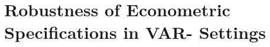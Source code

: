 \documentclass[a4paper,11pt,listof=nochaptergap,oneside,pointednumbers,bibtotoc,bigheadings,liststotoc,hidelinks]{scrbook}
\theoremstyle{mysatz}
\theoremstyle{mydefinition}
\theoremstyle{mytheorem}
\theoremstyle{mybemerkung}
\begin{document}
\section[Robustness of Econometric Specifications in VAR-Settings]{Robustness of Econometric Specifications in VAR-
Settings}
\label{sec:robustnessofeconspecs}


\end{document}
